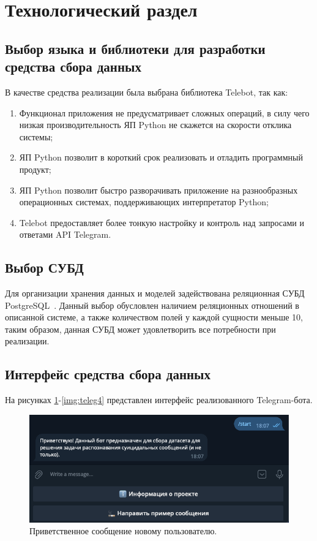 \section{Технологический раздел}

\subsection{Выбор языка и библиотеки для разработки средства сбора данных}

В качестве средства реализации была выбрана библиотека Telebot, так как:

\begin{enumerate}
	\item[1.] Функционал приложения не предусматривает сложных операций, в силу чего низкая производительность ЯП Python не скажется на скорости отклика системы;
	\item[2.] ЯП Python позволит в короткий срок реализовать и отладить программный продукт;
	\item[3.] ЯП Python позволит быстро разворачивать приложение на разнообразных операционных системах, поддерживающих интерпретатор Python;
	\item[4.] Telebot предоставляет более тонкую настройку и контроль над запросами и ответами API Telegram.
\end{enumerate}

\subsection{Выбор СУБД}

Для организации хранения данных и моделей задействована реляционная СУБД PostgreSQL~\cite{postgres}. Данный выбор обусловлен наличием реляционных отношений в описанной системе, а также количеством полей у каждой сущности меньше 10, таким образом, данная СУБД может удовлетворить все потребности при реализации.

\subsection{Интерфейс средства сбора данных}

На рисунках \ref{img:teleg1}-\ref{img:teleg4} представлен интерфейс реализованного Telegram-бота.

\begin{figure}[H]
	\centering
	\includegraphics[width=\textwidth]{inc/teleg1.png}
	\caption{ Приветственное сообщение новому пользователю. }
	\label{img:teleg1}
\end{figure}

